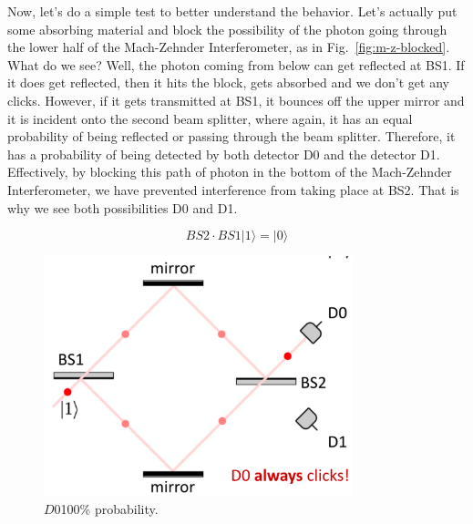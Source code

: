 Now, let's do a simple test to better understand the behavior. Let's actually put some absorbing material and block the possibility of the photon going through the lower half of the Mach-Zehnder Interferometer, as in Fig.~\ref{fig:m-z-blocked}. What do we see? Well, the photon coming from below can get reflected at BS1. If it does get reflected, then it hits the block, gets absorbed and we don't get any clicks. However, if it gets transmitted at BS1, it bounces off the upper mirror and it is incident onto the second beam splitter, where again, it has an equal probability of being reflected or passing through the beam splitter. Therefore, it has a probability of being detected by both detector D0 and the detector D1. Effectively, by blocking this path of photon in the bottom of the Mach-Zehnder Interferometer, we have prevented interference from taking place at BS2. That is why we see both possibilities D0 and D1.

\begin{equation}
B S 2 \cdot B S 1|1\rangle=|0\rangle
\end{equation}
\fi

\begin{figure}[H]
   \centering
    \includegraphics[width=0.8\textwidth]{lesson6/d0_always_clicks.pdf}
    
        \caption{$D0$100\% probability.}
    \label{fig:m-z-d0}
    
\end{figure}

